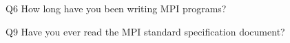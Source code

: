\begin{description}%
\item{Q6} How long have you been writing MPI programs?%
\item{Q9} Have you ever read the MPI standard specification document?%
\end{description}%
